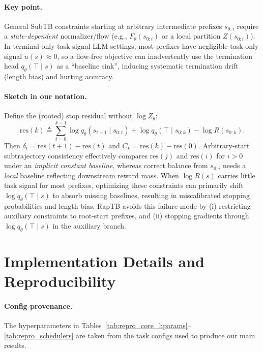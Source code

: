 \documentclass{article}
\theoremstyle{plain}
\theoremstyle{definition}
\theoremstyle{remark}
\begin{document}
\paragraph{Key point.}
General SubTB constraints starting at arbitrary intermediate prefixes $s_{0:i}$ require a
\emph{state-dependent} normalizer/flow (e.g., $F_\theta(s_{0:i})$ or a local partition $Z(s_{0:i})$).
In terminal-only-task-signal LLM settings, most prefixes have negligible task-only signal $u(s)\approx 0$,
so a flow-free objective can inadvertently use the termination head $q_\theta(\top\mid s)$ as a ``baseline sink'',
inducing systematic termination drift (length bias) and hurting accuracy.

\paragraph{Sketch in our notation.}
Define the (rooted) stop residual without $\log Z_\theta$:
\[
\mathrm{res}(k)
\triangleq
\sum_{t=0}^{k-1}\log q_\theta(s_{t+1}\mid s_{0:t})
+\log q_\theta(\top\mid s_{0:k})
-\log R(s_{0:k}).
\]
Then $\delta_t=\mathrm{res}(t{+}1)-\mathrm{res}(t)$ and $C_k=\mathrm{res}(k)-\mathrm{res}(0)$.
Arbitrary-start subtrajectory consistency effectively compares $\mathrm{res}(j)$ and $\mathrm{res}(i)$ for $i>0$
under an \emph{implicit constant baseline}, whereas correct balance from $s_{0:i}$ needs a \emph{local} baseline reflecting
downstream reward mass. When $\log R(s)$ carries little task signal for most prefixes, optimizing these constraints can primarily
shift $\log q_\theta(\top\mid s)$ to absorb missing baselines, resulting in miscalibrated stopping probabilities and length bias.
RapTB avoids this failure mode by (i) restricting auxiliary constraints to root-start prefixes,
and (ii) stopping gradients through $\log q_\theta(\top\mid s)$ in the auxiliary branch.



\section{Implementation Details and Reproducibility}
\label{app:repro}

\paragraph{Config provenance.}
The hyperparameters in Tables~\ref{tab:repro_core_hparams}--\ref{tab:repro_schedulers} are taken from the task configs used to produce our main results.
\end{document}
